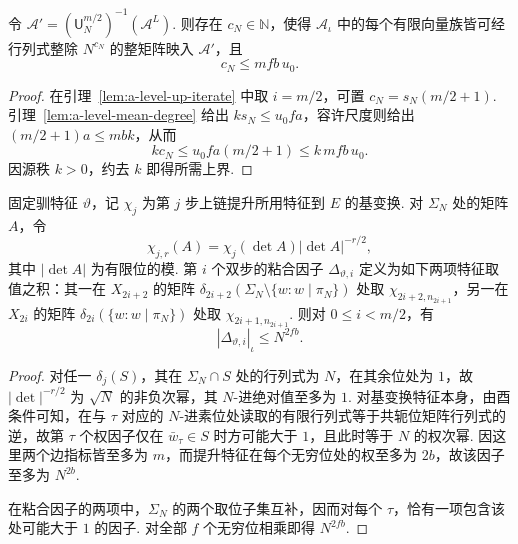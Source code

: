 \begin{lemma}[层素数处全源整模的余长]
\label{lem:a-level-up-colength}
\emitthmsource
令 $\mathcal A'=(\mathsf U_N^{m/2})^{-1}(\mathcal A^L)$. 则存在 $c_N\in\mathbb N$，使得 $\mathcal A_\iota$ 中的每个有限向量族皆可经行列式整除 $N^{c_N}$ 的整矩阵映入 $\mathcal A'$，且
\[
 c_N\le m f b\,u_0.
\]
\end{lemma}
\begin{proof}
在引理~\ref{lem:a-level-up-iterate} 中取 $i=m/2$，可置 $c_N=s_N(m/2+1)$. 引理~\ref{lem:a-level-mean-degree} 给出 $ks_N\le u_0fa$，容许尺度则给出 $(m/2+1)a\le mbk$，从而
\[
 kc_N \le u_0fa(m/2+1)\le k\,mfb\,u_0.
\]
因源秩 $k>0$，约去 $k$ 即得所需上界.
\end{proof}

\begin{lemma}[粘合换基的行列式特征因子]
\label{lem:a-level-glued-factor}
\emitthmsource
固定驯特征 $\vartheta$，记 $\chi_j$ 为第 $j$ 步上链提升所用特征到 $E$ 的基变换. 对 $\Sigma_N$ 处的矩阵 $A$，令
\[
 \chi_{j,r}(A)=\chi_j(\det A)|\det A|^{-r/2},
\]
其中 $|\det A|$ 为有限位的模. 第 $i$ 个双步的粘合因子 $\Delta_{\vartheta,i}$ 定义为如下两项特征取值之积：其一在 $X_{2i+2}$ 的矩阵 $\delta_{2i+2}(\Sigma_N\setminus\{w:w\mid\pi_N\})$ 处取 $\chi_{2i+2,n_{2i+1}}$，另一在 $X_{2i}$ 的矩阵 $\delta_{2i}(\{w:w\mid\pi_N\})$ 处取 $\chi_{2i+1,n_{2i+1}}$. 则对 $0\le i<m/2$，有
\[
 |\Delta_{\vartheta,i}|_\iota\le N^{2fb}.
\]
\end{lemma}
\begin{proof}
对任一 $\delta_j(S)$，其在 $\Sigma_N\cap S$ 处的行列式为 $N$，在其余位处为 $1$，故 $|\det|^{-r/2}$ 为 $\sqrt N$ 的非负次幂，其 $N$-进绝对值至多为 $1$. 对基变换特征本身，由酉条件可知，在与 $\tau$ 对应的 $N$-进素位处读取的有限行列式等于共轭位矩阵行列式的逆，故第 $\tau$ 个权因子仅在 $\bar w_\tau\in S$ 时方可能大于 $1$，且此时等于 $N$ 的权次幂. 因这里两个边指标皆至多为 $m$，而提升特征在每个无穷位处的权至多为 $2b$，故该因子至多为 $N^{2b}$.

在粘合因子的两项中，$\Sigma_N$ 的两个取位子集互补，因而对每个 $\tau$，恰有一项包含该处可能大于 $1$ 的因子. 对全部 $f$ 个无穷位相乘即得 $N^{2fb}$.
\end{proof}


